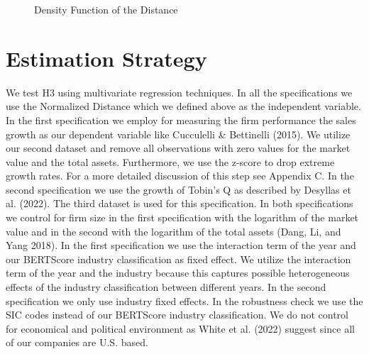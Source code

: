 \documentclass[
]{article}
\begin{document}
\begin{figure}


\caption{\label{fig-1}Density Function of the Distance}

\end{figure}%

\section{Estimation Strategy}\label{estimation-strategy}

We test H3 using multivariate regression techniques. In all the
specifications we use the Normalized Distance which we defined above as
the independent variable. In the first specification we employ for
measuring the firm performance the sales growth as our dependent
variable like Cucculelli \& Bettinelli (2015). We utilize our second
dataset and remove all observations with zero values for the market
value and the total assets. Furthermore, we use the z-score to drop
extreme growth rates. For a more detailed discussion of this step see
Appendix C. In the second specification we use the growth of Tobin's Q
as described by Desyllas et al. (2022). The third dataset is used for
this specification. In both specifications we control for firm size in
the first specification with the logarithm of the market value and in
the second with the logarithm of the total assets (Dang, Li, and Yang
2018). In the first specification we use the interaction term of the
year and our BERTScore industry classification as fixed effect. We
utilize the interaction term of the year and the industry because this
captures possible heterogeneous effects of the industry classification
between different years. In the second specification we only use
industry fixed effects. In the robustness check we use the SIC codes
instead of our BERTScore industry classification. We do not control for
economical and political environment as White et al. (2022) suggest
since all of our companies are U.S. based.
\end{document}
